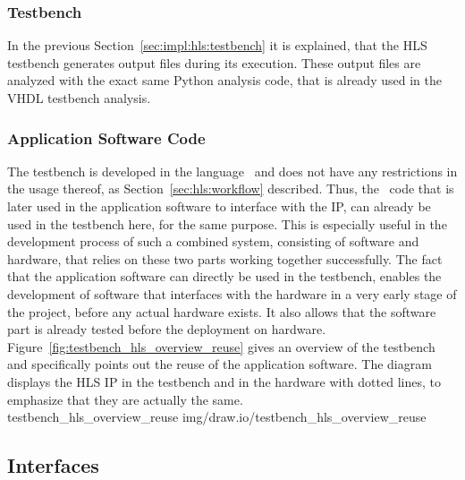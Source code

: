 \subsubsection{Testbench}

In the previous Section~\ref{sec:impl:hls:testbench} it is explained, that the HLS testbench generates output files during its execution.
These output files are analyzed with the exact same Python analysis code, that is already used in the VHDL testbench analysis.

\subsubsection{Application Software Code}

The testbench is developed in the language \cplusplus\ and does not have any restrictions in the usage thereof, as Section~\ref{sec:hls:workflow} described.
Thus, the \cplusplus\ code that is later used in the application software to interface with the IP, can already be used in the testbench here, for the same purpose.
This is especially useful in the development process of such a combined system, consisting of software and hardware, that relies on these two parts working together successfully.
The fact that the application software can directly be used in the testbench, enables the development of software that interfaces with the hardware in a very early stage of the project, before any actual hardware exists.
It also allows that the software part is already tested before the deployment on hardware.\\

Figure~\ref{fig:testbench_hls_overview_reuse} gives an overview of the testbench and specifically points out the reuse of the application software.
The diagram displays the HLS IP in the testbench and in the hardware with dotted lines, to emphasize that they are actually the same.\\

 {testbench_hls_overview_reuse} {img/draw.io/testbench_hls_overview_reuse}

\subsection{Interfaces}
\label{sec:impl:hls:interfaces}


